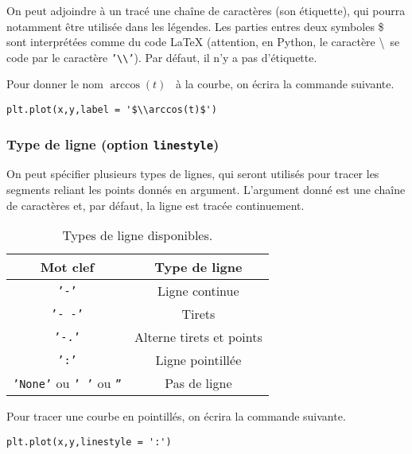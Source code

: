 On peut adjoindre à un tracé une chaîne de caractères (son étiquette), qui pourra notamment être utilisée dans les légendes. 
Les parties entres deux symboles \$ sont interprétées comme du code LaTeX  (attention, en Python, le caractère \textbackslash\ se code par le caractère \texttt{'\textbackslash\textbackslash'}). 
Par défaut, il n'y a pas d'étiquette.
\begin{exemple}
  Pour donner le nom \og $\arccos(t)$ \fg\ à la courbe, on écrira la commande suivante.
\begin{lstlisting}
plt.plot(x,y,label = '$\\arccos(t)$')
\end{lstlisting}
\end{exemple}
\subsubsection{Type de ligne (option \texttt{linestyle})}

On peut spécifier plusieurs types de lignes, qui seront utilisés pour tracer les segments reliant les points donnés en argument. 
L'argument donné est une chaîne de caractères et, par défaut, la ligne est tracée continuement. 

\begin{table}[!h]
  \begin{center}
    \begin{tabular}{|c|c|}
      \hline
      Mot clef & Type de ligne \\
      \hline
      \texttt{'-'} & Ligne continue \\
      \hline
      \texttt{'-  -'} & Tirets  \\
      \hline
      \texttt{'-.'} & Alterne tirets et points \\
      \hline
      \texttt{':'} & Ligne pointillée \\
      \hline
      \texttt{'None'} ou \texttt{' '} ou \texttt{''} & Pas de ligne \\
      \hline
    \end{tabular}
    \caption{Types de ligne disponibles.}
  \end{center}
\end{table}

\begin{exemple}
  Pour tracer une courbe en pointillés, on écrira la commande suivante.
\begin{lstlisting}
plt.plot(x,y,linestyle = ':')
\end{lstlisting}
\end{exemple}

